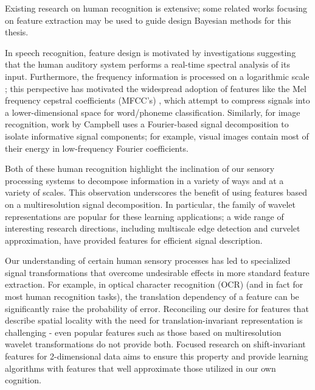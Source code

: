 \documentclass[12pt]{report}
\begin{document}
Existing research on human recognition is extensive; some related works focusing on feature extraction may be used to guide design Bayesian methods for this thesis. 

In speech recognition, feature design is motivated by investigations suggesting that the human auditory system performs a real-time spectral analysis \cite{rabiner} of its input. Furthermore, the frequency information is processed on a logarithmic scale \cite{flanagan}; this perspective has motivated the widespread adoption of features like the Mel frequency cepstral coefficients (MFCC's) \cite{picone}, which attempt to compress signals into a lower-dimensional space for word/phoneme classification. Similarly, for image recognition, work by Campbell \cite{campbell-orientation,campbell-fourier} uses a Fourier-based signal decomposition to isolate informative signal components; for example, visual images contain most of their energy in low-frequency Fourier coefficients. 

Both of these human recognition highlight the inclination of our sensory processing systems to decompose information in a variety of ways and at a variety of scales. This observation underscores the benefit of using features based on a multiresolution signal decomposition. In particular, the family of wavelet representations \cite{mallat-wavtour} are popular for these learning applications; a wide range of interesting research directions, including multiscale edge detection and curvelet approximation, have provided features for efficient signal description. 

Our understanding of certain human sensory processes has led to specialized signal transformations that overcome undesirable effects in more standard feature extraction. For example, in optical character recognition (OCR) (and in fact for most human recognition tasks), the translation dependency of a feature can be significantly raise the probability of error. Reconciling our desire for features that describe spatial locality with the need for translation-invariant representation is challenging - even popular features such as those based on multiresolution wavelet transformations \cite{mallat-multires} do not provide both. Focused research on shift-invariant features for 2-dimensional data \cite{marco} aims to ensure this property and provide learning algorithms with features that well approximate those utilized in our own cognition.
\end{document}
